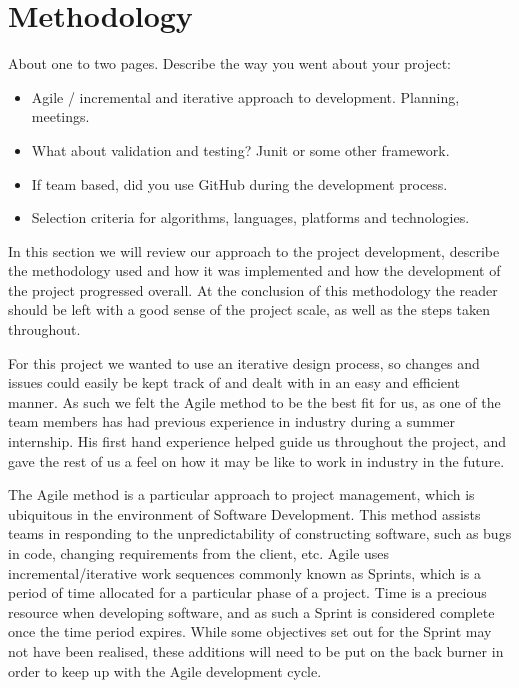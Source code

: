 
\chapter{Methodology}
About one to two pages.
Describe the way you went about your project:
\begin{itemize}
\item Agile / incremental and iterative approach to development. Planning, meetings.
\item What about validation and testing? Junit or some other framework.
\item If team based, did you use GitHub during the development process.
\item Selection criteria for algorithms, languages, platforms and technologies.
\end{itemize}

In this section we will review our approach to the project development, describe the methodology used and how it was implemented and how the development of the project progressed overall. At the conclusion of this methodology the reader should be left with a good sense of the project scale, as well as the steps taken throughout.

For this project we wanted to use an iterative design process, so changes and issues could easily be kept track of and dealt with in an easy and efficient manner. As such we felt the Agile method to be the best fit for us, as one of the team members has had previous experience in industry during a summer internship. His first hand experience helped guide us throughout the project, and gave the rest of us a feel on how it may be like to work in industry in the future.

The Agile method is a particular approach to project management, which is ubiquitous in the environment of Software Development. This method assists teams in responding to the unpredictability of constructing software, such as bugs in code, changing requirements from the client, etc. Agile uses incremental/iterative work sequences commonly known as Sprints, which is a period of time allocated for a particular phase of a project. Time is a precious resource when developing software, and as such a Sprint is considered complete once the time period expires. While some objectives set out for the Sprint may not have been realised, these additions will need to be put on the back burner in order to keep up with the Agile development cycle.

